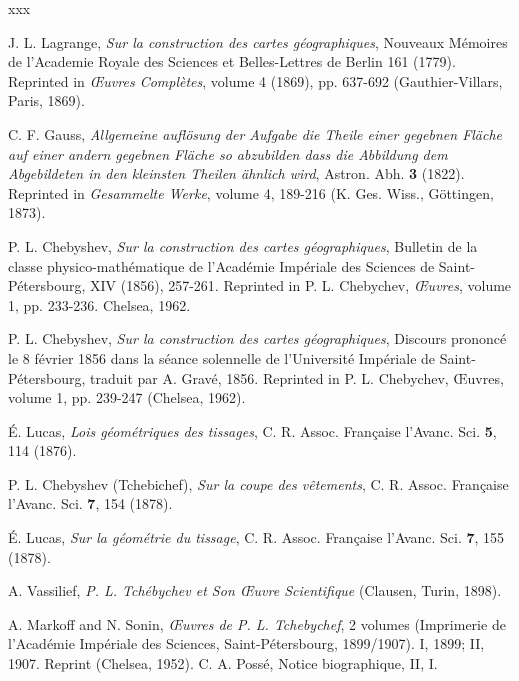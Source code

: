 \documentclass[12pt]{article}
\begin{document}
\begin{thebibliography}{xxx}

J. L. Lagrange, {\it Sur la construction des cartes g\'eographiques}, Nouveaux M\'emoires de l'Academie Royale des Sciences et Belles-Lettres de Berlin 161 (1779). Reprinted in {\it \OE uvres Compl\`etes}, volume 4 (1869), pp. 637-692 (Gauthier-Villars, Paris, 1869).

C. F. Gauss, {\it Allgemeine aufl\"osung der Aufgabe die Theile einer gegebnen Fl\"ache auf einer andern gegebnen Fl\"ache so abzubilden dass die Abbildung dem Abgebildeten in den kleinsten Theilen \"ahnlich wird}, Astron. Abh. {\bf 3} (1822). Reprinted in {\it Gesammelte Werke}, volume 4, 189-216 (K. Ges. Wiss., G\"ottingen, 1873).

P. L. Chebyshev, {\it Sur la construction des cartes g\'eographiques}, Bulletin de la classe physico-math\'ematique de l'Acad\'emie Imp\'eriale des Sciences de Saint-P\'etersbourg, XIV (1856), 257-261. Reprinted in P. L. Chebychev, {\it \OE uvres}, volume 1, pp. 233-236. Chelsea, 1962.

P. L. Chebyshev, {\it Sur la construction des cartes g\'eographiques}, Discours prononc\'e le 8 f\'evrier 1856 dans la s\'eance solennelle de l'Universit\'e Imp\'eriale de Saint-P\'etersbourg, traduit par A. Grav\'e, 1856. Reprinted in P. L. Chebychev, \OE uvres, volume 1, pp. 239-247 (Chelsea, 1962).

\'E. Lucas, {\it Lois g\'eom\'etriques des tissages}, C. R. Assoc. Fran\c caise l'Avanc. Sci. {\bf 5}, 114 (1876). 

P. L. Chebyshev (Tchebichef), {\it Sur la coupe des v\^etements}, C. R. Assoc. Fran\c caise l'Avanc. Sci. {\bf 7}, 154 (1878).

\'E. Lucas, {\it Sur la g\'eom\'etrie du tissage}, C. R. Assoc. Fran\c caise l'Avanc. Sci. {\bf 7}, 155 (1878).

A. Vassilief, {\it P. L. Tch\'ebychev et Son \OE uvre Scientifique} (Clausen, Turin, 1898).

A. Markoff and N. Sonin, {\it \OE uvres de P. L. Tchebychef}, 2 volumes (Imprimerie de l'Acad\'emie Imp\'eriale des Sciences, Saint-P\'etersbourg, 1899/1907). I, 1899; II, 1907. Reprint (Chelsea, 1952). C. A. Poss\'e, Notice biographique, II, I.


\end{thebibliography}
\end{document}
